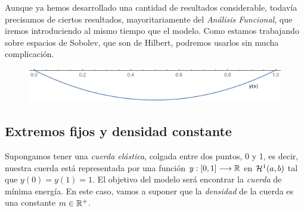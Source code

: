 Aunque ya hemos desarrollado una cantidad de resultados considerable, todavía precisamos de ciertos resultados, mayoritariamente del \textit{Análisis Funcional}, que iremos introduciendo al mismo tiempo que el modelo. Como estamos trabajando sobre espacios de Sobolev, que son de Hilbert, podremos usarlos sin mucha complicación.

\begin{figure}[h]
   \center
  \includegraphics[scale=0.5]{img/cuerdanormal.png}
\end{figure}

\subsection{Extremos fijos y densidad constante}

Supongamos tener una \textit{cuerda elástica}, colgada entre dos puntos, 0 y 1, es decir, nuestra cuerda está representada por una función $y : [0,1] \longrightarrow \mathbb{R}$ en $\mathcal{H}^{ 1 } (a,b)$ tal que $y(0)=y(1)=1$. El objetivo del modelo será encontrar la \textit{cuerda} de mínima energía. En este caso, vamos a suponer que la \textit{densidad} de la cuerda es una constante $m\in\mathbb{R}^+$. 

